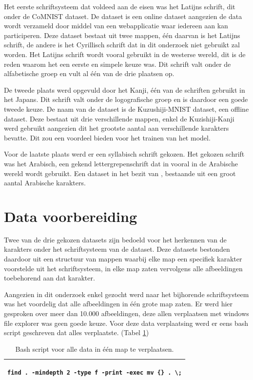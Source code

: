 Het eerste schriftsysteem dat voldeed aan de eisen was het Latijns schrift, dit onder de CoMNIST dataset.
De dataset is een online dataset aangezien de data wordt verzameld door middel van een webapplicatie waar iedereen aan kan participeren.
Deze dataset bestaat uit twee mappen, één daarvan is het Latijns schrift, de andere is het Cyrillisch schrift dat in dit onderzoek niet gebruikt zal worden.
Het Latijns schrift wordt vooral gebruikt in de westerse wereld, dit is de reden waarom het een eerste en simpele keuze was.
Dit schrift valt onder de alfabetische groep en vult al één van de drie plaatsen op.

De tweede plaats werd opgevuld door het Kanji, één van de schriften gebruikt in het Japans.
Dit schrift valt onder de logografische groep en is daardoor een goede tweede keuze.
De naam van de dataset is de Kuzushiji-MNIST dataset, een offline dataset.
Deze bestaat uit drie verschillende mappen, enkel de Kuzishiji-Kanji werd gebruikt aangezien dit het grootste aantal aan verschillende karakters bevatte.
Dit zou een voordeel bieden voor het trainen van het model.

Voor de laatste plaats werd er een syllabisch schrift gekozen.
Het gekozen schrift was het Arabisch, een gekend lettergrepenschrift dat in vooral in de Arabische wereld wordt gebruikt.
Een dataset in het bezit van \autocite{Ahmed2017}, bestaande uit een groot aantal Arabische karakters.

\section{Data voorbereiding}

Twee van de drie gekozen datasets zijn bedoeld voor het herkennen van de karakters onder het schriftsysteem van de dataset.
Deze datasets bestonden daardoor uit een structuur van mappen waarbij elke map een specifiek karakter voorstelde uit het schriftsysteem, in elke map zaten vervolgens alle afbeeldingen toebehorend aan dat karakter.

Aangezien in dit onderzoek enkel gezocht werd naar het bijhorende schriftsysteem was het voordelig dat alle afbeeldingen in één grote map zaten.
Er werd hier gesproken over meer dan 10.000 afbeeldingen, deze allen verplaatsen met windows file explorer was geen goede keuze.
Voor deze data verplaatsing werd er eens bash script geschreven dat alles verplaatste. (Tabel \ref{table:BashScript})

\begin{table}[!htbp]
    \begin{tabular}{|l|}
        \hline
        \begin{lstlisting}
find . -mindepth 2 -type f -print -exec mv {} . \;
        \end{lstlisting}
        \\ \hline
    \end{tabular}
    \caption{Bash script voor alle data in één map te verplaatsen. }\label{table:BashScript}
\end{table}

